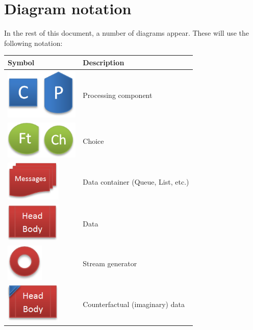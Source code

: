 \documentclass[]{scrartcl}
\begin{document}


\section{Diagram notation}

In the rest of this document, a number of diagrams appear. These will use the following notation:

\begin{center}
	\begin{tabular}{p{}@{}p{}@{}}
		\toprule
		Symbol & Description\\
		\midrule
		\includegraphics[width=100pt]{figs/legend_proc.png} \dotfill & Processing component\\
		\includegraphics[width=100pt]{figs/legend_choice.png} \dotfill & Choice\\
		\includegraphics[width=75pt]{figs/legend_container.png} \dotfill & Data container (Queue, List, etc.)\\
		\includegraphics[width=75pt]{figs/legend_data.png} \dotfill & Data\\
		\includegraphics[width=50pt]{figs/legend_generator.png} \dotfill & Stream generator\\
		\includegraphics[width=75pt]{figs/legend_imaginary.png} \dotfill & Counterfactual (imaginary) data\\
		\bottomrule
	\end{tabular}
\end{center}
\end{document}
